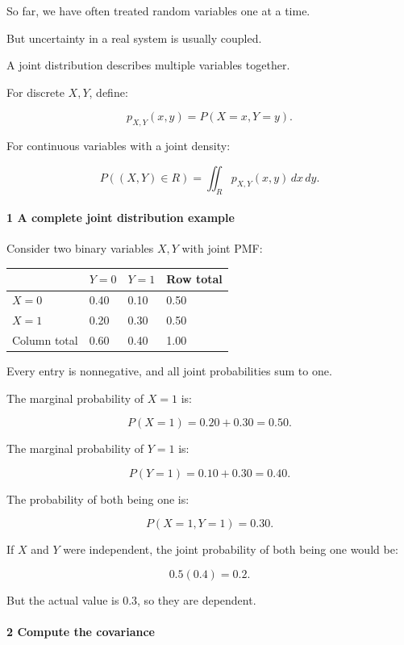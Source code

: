 So far, we have often treated random variables one at a time.

But uncertainty in a real system is usually coupled.

A joint distribution describes multiple variables together.

For discrete \(X,Y\), define:

\[
 \boxed{ p_{X,Y}(x,y)=P(X=x,Y=y) }.
\]

For continuous variables with a joint density:

\[
 \boxed{ P((X,Y)\in R) = \iint_Rp_{X,Y}(x,y)\,dx\,dy }.
\]

\paragraph{1 A complete joint distribution example}\label{a-complete-joint-distribution-example}

Consider two binary variables \(X,Y\) with joint PMF:

{\def\LTcaptype{none} %
\begin{longtable}[]{@{}llll@{}}
\toprule\noalign{}
& \(Y=0\) & \(Y=1\) & Row total \\
\midrule\noalign{}
\endhead
\bottomrule\noalign{}
\endlastfoot
\(X=0\) & 0.40 & 0.10 & 0.50 \\
\(X=1\) & 0.20 & 0.30 & 0.50 \\
Column total & 0.60 & 0.40 & 1.00 \\
\end{longtable}
}

Every entry is nonnegative, and all joint probabilities sum to one.

The marginal probability of \(X=1\) is:

\[
 P(X=1)=0.20+0.30=0.50.
\]

The marginal probability of \(Y=1\) is:

\[
 P(Y=1)=0.10+0.30=0.40.
\]

The probability of both being one is:

\[
 P(X=1,Y=1)=0.30.
\]

If \(X\) and \(Y\) were independent, the joint probability of both being one would be:

\[
 0.5(0.4)=0.2.
\]

But the actual value is \(0.3\), so they are dependent.

\paragraph{2 Compute the covariance}\label{compute-the-covariance}

